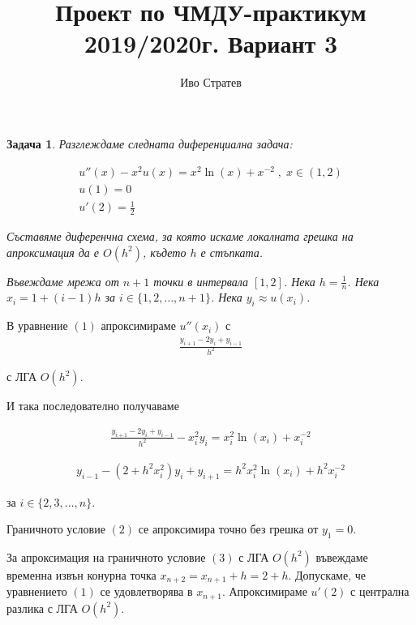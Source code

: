 \documentclass[12pt]{article}
\author{Иво Стратев}
\title{Проект по ЧМДУ-практикум 2019/2020г. Вариант 3}
\newtheorem{problem}{Задача}%
\begin{document}
\maketitle

\begin{problem}
Разглеждаме следната диференциална задача:

\begin{align}
u''(x) - x^2u(x) = x^2\ln(x) + x^{-2} \;, \; x \in (1, 2) \\
u(1) = 0 \\
u'(2) = \frac{1}{2}
\end{align}

Съставяме диференчна схема, за която искаме локалната грешка на апроксимация да е \(O(h^2)\),
където \(h\) е стъпката.

\vspace{0.5cm}

Въвеждаме мрежа от \(n + 1\) точки в интервала \([1, 2]\).
Нека \(h = \frac{1}{n}\).
Нека \(x_i = 1 + (i - 1)h\) за \(i \in \{1, 2, \dots, n + 1\}\). 
Нека \(y_i \approx u(x_i)\). 
\end{problem}

\vspace{0.5cm}

В уравнение \((1)\) апроксимираме \(u''(x_i)\) с
\begin{align*}
\displaystyle\frac{y_{i + 1} - 2y_i + y_{i - 1}}{h^2}
\end{align*}

с ЛГА \(O(h^2)\).

И така последователно получаваме

\begin{align*}
\displaystyle\frac{y_{i + 1} - 2y_i + y_{i - 1}}{h^2} - x_i^2y_i = x_i^2\ln(x_i) + x_i^{-2}
\end{align*}

\begin{align*}
y_{i - 1} -(2 + h^2x_i^2)y_i + y_{i + 1} = h^2x_i^2\ln(x_i) + h^2x_i^{-2}
\end{align*}

за \(i \in \{2, 3, \dots, n\}\).

\vspace{0.5cm}

Граничното условие \((2)\) се апроксимира точно без грешка от \(y_1 = 0\).

\vspace{0.5cm}

За апроксимация на граничното условие \((3)\) с ЛГА \(O(h^2)\)
въвеждаме временна извън конурна точка \(x_{n + 2} = x_{n + 1} + h = 2 + h\).
Допускаме, че уравнението \((1)\) се удовлетворява в \(x_{n + 1}\).
Апроксимираме \(u'(2)\) с централна разлика с ЛГА \(O(h^2)\).
\end{document}
